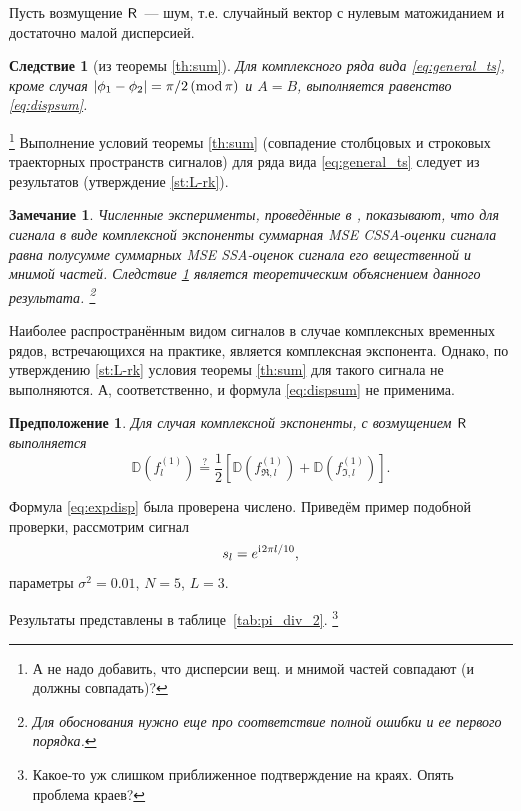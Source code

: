 \documentclass[specialist,
               substylefile = spbu.rtx,
               subf,href,colorlinks=true, 12pt]{disser}
\newtheorem{remark}{Замечание}
\newtheorem{corollary}{Следствие}
\newtheorem*{prop*}{Предположение}
\begin{document}
Пусть возмущение $\textsf{R}$~--- шум, т.е. случайный вектор с нулевым матожиданием и достаточно малой дисперсией.

\begin{corollary}[из теоремы {\ref{th:sum}}] \label{cor:harm}
	Для комплексного ряда вида \eqref{eq:general_ts}, кроме случая $|\phi_1-\phi_2| = \pi/2\,(\mathop{\mathrm{mod}} \pi)$ и $A=B$,  выполняется равенство \eqref{eq:dispsum}.
\end{corollary}
\footnote{А не надо добавить, что дисперсии вещ. и мнимой частей совпадают (и должны совпадать)?}
Выполнение условий теоремы {\ref{th:sum}} (совпадение столбцовых и строковых траекторных пространств сигналов) для ряда вида \eqref{eq:general_ts} следует из результатов \cite{Golyandina.Stepanov2005} (утверждение \ref{st:L-rk}).

\begin{remark}
	Численные эксперименты, проведённые в \cite{Golyandina.etal2013}, показывают, что для сигнала в виде комплексной экспоненты суммарная MSE CSSA-оценки сигнала равна полусумме суммарных MSE SSA-оценок сигнала его вещественной и мнимой частей. Следствие \ref{cor:harm} является теоретическим объяснением данного результата. \footnote{Для обоснования нужно еще про соответствие полной ошибки и ее первого порядка.}
\end{remark}

Наиболее распространённым видом сигналов в случае комплексных временных рядов, встречающихся на практике, является комплексная экспонента. Однако, по утверждению \ref{st:L-rk} условия теоремы \ref{th:sum} для такого сигнала не выполняются. А, соответственно, и формула \eqref{eq:dispsum} не применима.

\begin{prop*}
	Для случая комплексной экспоненты, с возмущением $\textsf{R}$ выполняется
	\begin{equation} \label{eq:expdisp}
		\mathbb{D}(f^{(1)}_l) \stackrel{?}{=} \frac{1}{2}[\mathbb{D}(f^{(1)}_{\Re, l}) + \mathbb{D}(f^{(1)}_{\Im, l})].
	\end{equation}
\end{prop*}

Формула \eqref{eq:expdisp} была проверена числено. Приведём пример подобной проверки, рассмотрим сигнал
$$s_l = e^{\mathrm{i}\mkern1mu 2 \pi l / 10},$$
параметры $\sigma^2 = 0.01$, $N = 5$, $L = 3$.

Результаты представлены в таблице~\ref{tab:pi_div_2}.
\footnote{Какое-то уж слишком приближенное подтверждение на краях. Опять проблема краев?}
\end{document}
